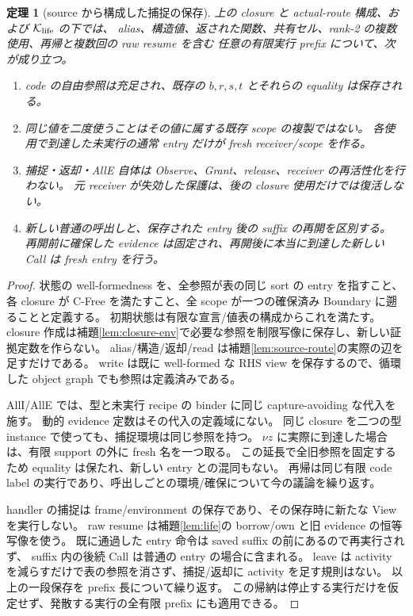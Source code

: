 \documentclass[11pt,a4paper]{article}
\newtheorem{theorem}[definition]{定理}
\newcommand{\Core}{\mathcal K}
\begin{document}
\begin{theorem}[source から構成した捕捉の保存]
\label{thm:capture}
上の closure と actual-route 構成、および \(\Core_{\rm life}\) の下では、
alias、構造値、返された関数、共有セル、rank-2 の複数使用、再帰と複数回の raw resume を含む
任意の有限実行 prefix について、次が成り立つ。
\begin{enumerate}
\item code の自由参照は充足され、既存の \(b,r,s,t\) とそれらの equality は保存される。
\item 同じ値を二度使うことはその値に属する既存 scope の複製ではない。
各使用で到達した未実行の通常 entry だけが fresh receiver/scope を作る。
\item 捕捉・返却・AllE 自体は Observe、Grant、release、receiver の再活性化を行わない。
元 receiver が失効した保護は、後の closure 使用だけでは復活しない。
\item 新しい普通の呼出しと、保存された entry 後の suffix の再開を区別する。
再開前に確保した evidence は固定され、再開後に本当に到達した新しい Call は fresh entry を行う。
\end{enumerate}
\end{theorem}
\begin{proof}
状態の well-formedness を、全参照が表の同じ sort の entry を指すこと、
各 closure が C-Free を満たすこと、全 scope が一つの確保済み Boundary に遡ることと定義する。
初期状態は有限な宣言/値表の構成からこれを満たす。
closure 作成は補題\ref{lem:closure-env}で必要な参照を制限写像に保存し、新しい証拠定数を作らない。
alias/構造/返却/read は補題\ref{lem:source-route}の実際の辺を足すだけである。
write は既に well-formed な RHS view を保存するので、循環した object graph でも参照は定義済みである。

AllI/AllE では、型と未実行 recipe の binder に同じ capture-avoiding な代入を施す。
動的 evidence 定数はその代入の定義域にない。
同じ closure を二つの型 instance で使っても、捕捉環境は同じ参照を持つ。
\(\nu z\) に実際に到達した場合は、有限 support の外に fresh 名を一つ取る。
この延長で全旧参照を固定するため equality は保たれ、新しい entry との混同もない。
再帰は同じ有限 code label の実行であり、呼出しごとの環境/確保について今の議論を繰り返す。

handler の捕捉は frame/environment の保存であり、その保存時に新たな View を実行しない。
raw resume は補題\ref{lem:life}の borrow/own と旧 evidence の恒等写像を使う。
既に通過した entry 命令は saved suffix の前にあるので再実行されず、
suffix 内の後続 Call は普通の entry の場合に含まれる。
leave は activity を減らすだけで表の参照を消さず、捕捉/返却に activity を足す規則はない。
以上の一段保存を prefix 長について繰り返す。
この帰納は停止する実行だけを仮定せず、発散する実行の全有限 prefix にも適用できる。
\end{proof}
\end{document}
